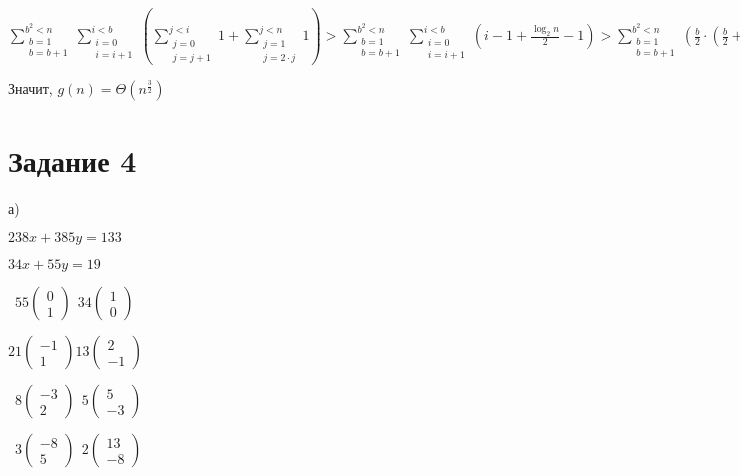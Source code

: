 \documentclass[a4paper,12pt]{article}
\begin{document}
$\sum\limits_{\substack{b=1 \\ b=b+1}}^{b^2<n}\sum\limits_{\substack{i=0 \\ i=i+1}}^{i<b}\left( \sum\limits_{\substack{j=0\\ j=j+1}}^{j<i}1+\sum\limits_{\substack{j=1\\j=2\cdot j}}^{j<n}1\right)>
\sum\limits_{\substack{b=1 \\ b=b+1}}^{b^2<n}\sum\limits_{\substack{i=0 \\ i=i+1}}^{i<b}\left(i-1+\frac{\log_{2}n}{2}-1\right)>\sum\limits_{\substack{b=1 \\ b=b+1}}^{b^2<n}\left( \frac{b}{2}\cdot \left( \frac{b}{2}+\frac{n}{2}-2\right) \right) > \frac{\sqrt{n}}{2} \cdot \left( \frac{\sqrt{n}}{4}\cdot\left( \frac{\sqrt{n}}{4}+\frac{\log_{2}n}{2}-2\right) \right) > \frac{n}{8}\cdot (\sqrt{n}-2) = \frac{1}{8}n^{\frac{3}{2}}-\frac{1}{4}n=\Theta(n^{\frac{3}{2}})$

Значит, $g(n)=\Theta(n^{\frac{3}{2}})$

\section*{Задание 4}  
\hspace{0.5cm}
а)

$238x+385y=133$

$34x+55y=19$

\ $55\begin{pmatrix}
	0\\1
\end{pmatrix}\ \ 
34\begin{pmatrix}
1\\0
\end{pmatrix}$

$21\begin{pmatrix}
	-1\\1
\end{pmatrix}
13\begin{pmatrix}
	2\\-1
\end{pmatrix}$

\ $8\begin{pmatrix}
-3\\2
\end{pmatrix}\ \ 
5\begin{pmatrix}
5\\-3
\end{pmatrix}$

\ $3\begin{pmatrix}
-8\\5
\end{pmatrix}\ \
2\begin{pmatrix}
13\\-8
\end{pmatrix}$
\end{document}
